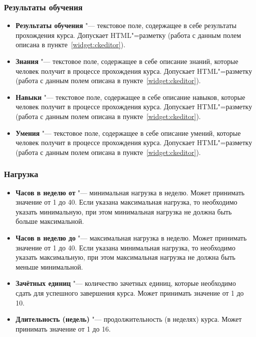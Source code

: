 \subsubsection{Результаты обучения}
	\begin{itemize}
		\item \textbf{Результаты обучения} "--- текстовое поле, содержащее в себе результаты прохождения курса. Допускает HTML"=разметку (работа с данным полем описана в пункте~\ref{widget:ckeditor}).
		\item \textbf{Знания} "--- текстовое поле, содержащее в себе описание знаний, которые человек получит в процессе прохождения курса. Допускает HTML"=разметку (работа с данным полем описана в пункте~\ref{widget:ckeditor}).
		\item \textbf{Навыки} "--- текстовое поле, содержащее в себе описание навыков, которые человек получит в процессе прохождения курса. Допускает HTML"=разметку (работа с данным полем описана в пункте~\ref{widget:ckeditor}).
		\item \textbf{Умения} "--- текстовое поле, содержащее в себе описание умений, которые человек получит в процессе прохождения курса. Допускает HTML"=разметку (работа с данным полем описана в пункте~\ref{widget:ckeditor}).
	\end{itemize}
\subsubsection{Нагрузка}
	\begin{itemize}
		\item \textbf{Часов в неделю от} "--- минимальная нагрузка в неделю. Может принимать значение от 1 до 40. Если указана максимальная нагрузка, то необходимо указать минимальную, при этом минимальная нагрузка не должна быть больше максимальной.
		\item \textbf{Часов в неделю до} "--- максимальная нагрузка в неделю. Может принимать значение от 1 до 40. Если указана минимальная нагрузка, то необходимо указать максимальную, при этом максимальная нагрузка не должна быть меньше минимальной.
		\item \textbf{Зачётных единиц} "--- количество зачетных единиц, которые необходимо сдать для успешного завершения курса. Может принимать значение от 1 до 10.
		\item \textbf{Длительность (недель)} "--- продолжительность (в неделях) курса. Может принимать значение от 1 до 16.
	\end{itemize}
